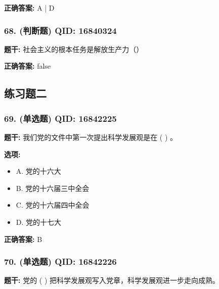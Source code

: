 \documentclass[12pt,UTF8]{ctexart}
\begin{document}
\textbf{正确答案:}
A | D

\vspace{0.3em}\hrulefill\vspace{0.7em}

\subsubsection*{68. (判断题) \small QID: 16840324}

\textbf{题干:}
社会主义的根本任务是解放生产力（）

\textbf{正确答案:}
false

\vspace{0.3em}\hrulefill\vspace{0.7em}

\subsection*{练习题二}

\subsubsection*{69. (单选题) \small QID: 16842225}

\textbf{题干:}
我们党的文件中第一次提出科学发展观是在 ( ) 。

\textbf{选项:}
\begin{itemize}[leftmargin=*]

  \item A. 党的十六大

  \item B. 党的十六届三中全会

  \item C. 党的十六届四中全会

  \item D. 党的十七大

\end{itemize}

\textbf{正确答案:}
B

\vspace{0.3em}\hrulefill\vspace{0.7em}

\subsubsection*{70. (单选题) \small QID: 16842226}

\textbf{题干:}
党的 ( ) 把科学发展观写入党章，科学发展观进一步走向成熟。
\end{document}
